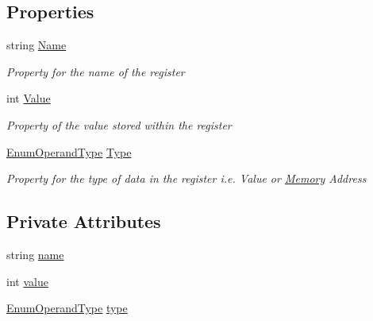 \subsection*{Properties}
\begin{DoxyCompactItemize}
\item 
string \hyperlink{class_c_p_u___o_s___simulator_1_1_c_p_u_1_1_register_a75621754d2c4c740c52b6c21a8151dc4}{Name}
\begin{DoxyCompactList}\small\item\em Property for the name of the register \end{DoxyCompactList}\item 
int \hyperlink{class_c_p_u___o_s___simulator_1_1_c_p_u_1_1_register_a1cabe4ad65d4dc6267be9f34d682e181}{Value}
\begin{DoxyCompactList}\small\item\em Property of the value stored within the register \end{DoxyCompactList}\item 
\hyperlink{namespace_c_p_u___o_s___simulator_1_1_c_p_u_ad49cfe442b74115a326c03b7ae848f76}{Enum\+Operand\+Type} \hyperlink{class_c_p_u___o_s___simulator_1_1_c_p_u_1_1_register_ac9df7ddedb74ab974a57a334b42e0381}{Type}
\begin{DoxyCompactList}\small\item\em Property for the type of data in the register i.\+e. Value or \hyperlink{namespace_c_p_u___o_s___simulator_1_1_memory}{Memory} Address \end{DoxyCompactList}\end{DoxyCompactItemize}
\subsection*{Private Attributes}
\begin{DoxyCompactItemize}
\item 
string \hyperlink{class_c_p_u___o_s___simulator_1_1_c_p_u_1_1_register_a1d9405f19dc212f0ff3d3307469451db}{name}
\item 
int \hyperlink{class_c_p_u___o_s___simulator_1_1_c_p_u_1_1_register_af2a05af808a3e2fa5fb086844cab1c2d}{value}
\item 
\hyperlink{namespace_c_p_u___o_s___simulator_1_1_c_p_u_ad49cfe442b74115a326c03b7ae848f76}{Enum\+Operand\+Type} \hyperlink{class_c_p_u___o_s___simulator_1_1_c_p_u_1_1_register_acb2f0f96db7cdee5c175562a5f050d83}{type}
\end{DoxyCompactItemize}


